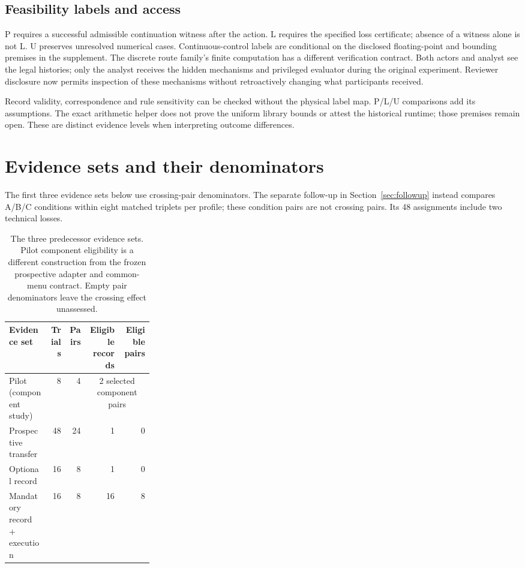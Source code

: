 \subsection{Feasibility labels and access}
P requires a successful admissible continuation witness after the action.
L requires the specified loss certificate; absence of a witness alone is not
L. U preserves unresolved numerical cases. Continuous-control labels are
conditional on the disclosed floating-point and bounding premises in the
supplement. The discrete route family's finite computation has a different
verification contract. Both actors and analyst see the legal histories; only
the analyst receives the hidden mechanisms and privileged evaluator during
the original experiment. Reviewer disclosure now permits inspection of these
mechanisms without retroactively changing what participants received.

Record validity, correspondence and rule sensitivity can be checked without
the physical label map. P/L/U comparisons add its assumptions. The exact
arithmetic helper does not prove the uniform library bounds or attest the
historical runtime; those premises remain open. These are distinct evidence
levels when interpreting outcome differences.

\section{Evidence sets and their denominators}
The first three evidence sets below use crossing-pair denominators.
The separate follow-up in Section~\ref{sec:followup} instead compares A/B/C
conditions within eight matched triplets per profile; these condition pairs
are not crossing pairs. Its 48 assignments include two technical losses.
\begin{table}[htbp]
\centering\small
\begin{tabular}{p{0.28\linewidth}rrrr}
\toprule
Evidence set & Trials & Pairs & Eligible records & Eligible pairs\\
\midrule
Pilot (component study) & 8 & 4 & \multicolumn{2}{c}{2 selected component pairs}\\
Prospective transfer & 48 & 24 & 1 & 0\\
Optional record & 16 & 8 & 1 & 0\\
Mandatory record + execution & 16 & 8 & 16 & 8\\
\bottomrule
\end{tabular}
\caption{The three predecessor evidence sets. Pilot component eligibility is a different
construction from the frozen prospective adapter and common-menu contract.
Empty pair denominators leave the crossing effect unassessed.}
\end{table}

